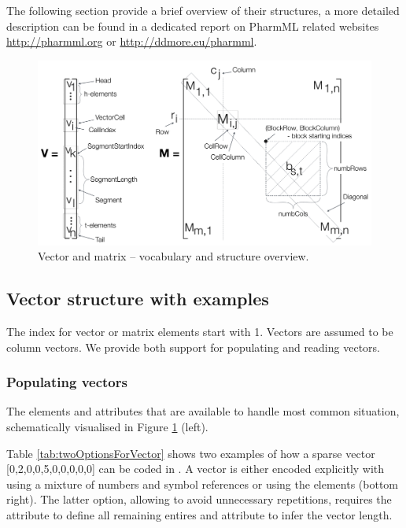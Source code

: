 The following section provide a brief overview of their structures, a more detailed 
description can be found in a dedicated report on PharmML related websites 
\url{http://pharmml.org} or \url{http://ddmore.eu/pharmml}.

\begin{figure}[htbp]
\centering
 \includegraphics[width=170mm]{pics/VectorMatrixStructure}
\caption{Vector and matrix -- vocabulary and structure overview.}
\label{fig:vectorMatrix}
\end{figure}



\subsection{Vector structure with examples}
\label{subsec:vectorType}
The index for vector or matrix elements start with 1. Vectors are assumed to 
be column vectors. We provide both support for populating and reading 
vectors. 

\subsubsection{Populating vectors}
The elements and attributes that are available to handle most common situation,
schematically visualised in Figure \ref{fig:vectorMatrix} (left).

Table \ref{tab:twoOptionsForVector} shows two examples of how a sparse vector 
[0,2,0,0,5,0,0,0,0,0] can be coded in \pharmml. A vector is either 
encoded explicitly with  using a mixture of numbers 
and symbol references or using the  elements (bottom right). 
The latter option, allowing to avoid unnecessary repetitions, requires the 
 attribute to define all remaining entires and  attribute 
to infer the vector length.

